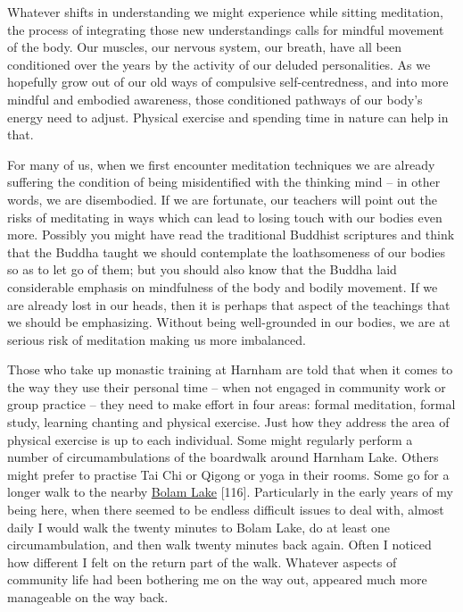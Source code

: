 Whatever shifts in understanding we might experience while sitting
meditation, the process of integrating those new understandings calls
for mindful movement of the body. Our muscles, our nervous system, our
breath, have all been conditioned over the years by the activity of our
deluded personalities. As we hopefully grow out of our old ways of
compulsive self-centredness, and into more mindful and embodied
awareness, those conditioned pathways of our body's energy need to
adjust. Physical exercise and spending time in nature can help in that.

For many of us, when we first encounter meditation techniques we are
already suffering the condition of being misidentified with the thinking
mind -- in other words, we are disembodied. If we are fortunate, our
teachers will point out the risks of meditating in ways which can lead
to losing touch with our bodies even more. Possibly you might have read
the traditional Buddhist scriptures and think that the Buddha taught we
should contemplate the loathsomeness of our bodies so as to let go of
them; but you should also know that the Buddha laid considerable
emphasis on mindfulness of the body and bodily movement. If we are
already lost in our heads, then it is perhaps that aspect of the
teachings that we should be emphasizing. Without being well-grounded in
our bodies, we are at serious risk of meditation making us more
imbalanced.

Those who take up monastic training at Harnham are told that when it
comes to the way they use their personal time -- when not engaged in
community work or group practice -- they need to make effort in four
areas: formal meditation, formal study, learning chanting and physical
exercise. Just how they address the area of physical exercise is up to
each individual. Some might regularly perform a number of
circumambulations of the boardwalk around Harnham Lake. Others might
prefer to practise Tai Chi or Qigong or yoga in their rooms. Some go for
a longer walk to the nearby
\href{https://www.northumberland.gov.uk/Local/Country-parks-visitor-centres-coastal-sitesPubl/Bolam-Lake.aspx}{\underline{Bolam
Lake}} {[}116{]}. Particularly in the early years of my being here, when
there seemed to be endless difficult issues to deal with, almost daily I
would walk the twenty minutes to Bolam Lake, do at least one
circumambulation, and then walk twenty minutes back again. Often I
noticed how different I felt on the return part of the walk. Whatever
aspects of community life had been bothering me on the way out, appeared
much more manageable on the way back.

